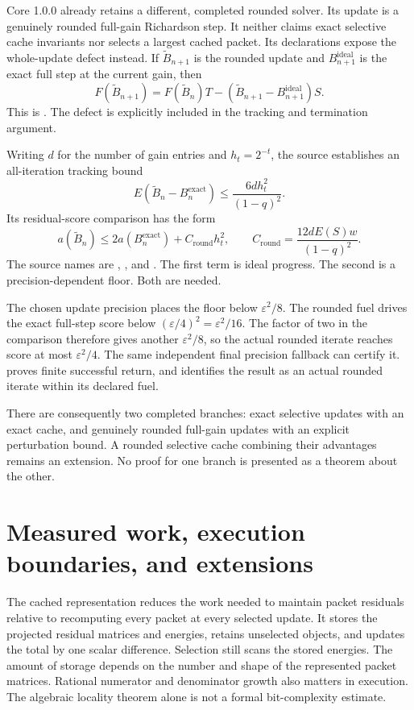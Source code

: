Core 1.0.0 already retains a different, completed rounded solver. Its update is a
genuinely rounded full-gain Richardson step. It neither claims exact selective
cache invariants nor selects a largest cached packet. Its declarations expose
the whole-update defect instead. If $\widetilde B_{n+1}$ is the rounded update
and $B_{n+1}^{\mathrm{ideal}}$ is the exact full step at the current gain, then
\[
 F(\widetilde B_{n+1})=F(\widetilde B_n)T
 -(\widetilde B_{n+1}-B_{n+1}^{\mathrm{ideal}})S.
\]
This is . The defect is explicitly included in the
tracking and termination argument.

Writing $d$ for the number of gain entries and $h_t=2^{-t}$, the source establishes
an all-iteration tracking bound
\[
 E(\widetilde B_n-B_n^{\mathrm{exact}})
 \le\frac{6d h_t^2}{(1-q)^2}.
\]
Its residual-score comparison has the form
\[
 a(\widetilde B_n)\le2a(B_n^{\mathrm{exact}})+C_{\mathrm{round}}h_t^2,
 \qquad
 C_{\mathrm{round}}=
 \frac{12dE(S)w}{(1-q)^2}.
\]
The source names are , , and
. The first term is ideal progress. The second is a
precision-dependent floor. Both are needed.

The chosen update precision  places the floor below
$\varepsilon^2/8$. The rounded fuel  drives the exact full-step
score below $(\varepsilon/4)^2=\varepsilon^2/16$. The factor of two in the
comparison therefore gives another $\varepsilon^2/8$, so the actual rounded
iterate reaches score at most $\varepsilon^2/4$. The same independent final
precision fallback can certify it.  proves finite
successful return, and  identifies the result
as an actual rounded iterate within its declared fuel.

There are consequently two completed branches: exact selective updates with an
exact cache, and genuinely rounded full-gain updates with an explicit perturbation
bound. A rounded selective cache combining their advantages remains an extension.
No proof for one branch is presented as a theorem about the other.

\section{Measured work, execution boundaries, and extensions}
\label{sec:solver-performance}

The cached representation reduces the work needed to maintain packet residuals
relative to recomputing every packet at every selected update. It stores the
projected residual matrices and energies, retains unselected objects, and updates
the total by one scalar difference. Selection still scans the stored energies.
The amount of storage depends on the number and shape of the represented packet
matrices. Rational numerator and denominator growth also matters in execution.
The algebraic locality theorem alone is not a formal bit-complexity estimate.

